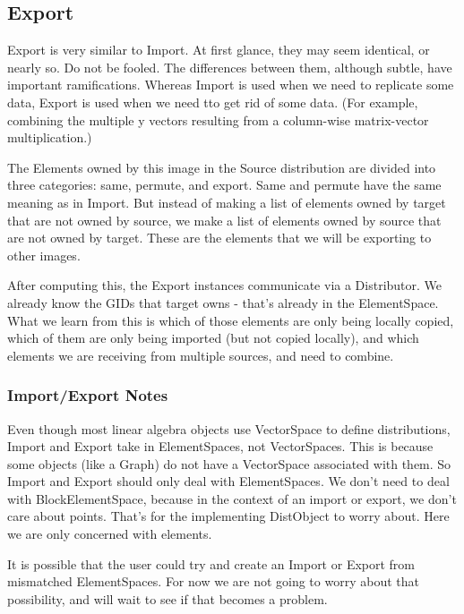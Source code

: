 \documentclass[10pt,relax]{TpetraDesign}
\begin{document}

%
\subsection{Export}

Export is very similar to Import. At first glance, they may seem identical, or nearly so. Do not be fooled. The differences between them, although subtle, have important ramifications. Whereas Import is used when we need to replicate some data, Export is used when we need tto get rid of some data. (For example, combining the multiple y vectors resulting from a column-wise matrix-vector multiplication.)

The Elements owned by this image in the Source distribution are divided into three categories: same, permute, and export. Same and permute have the same meaning as in Import. But instead of making a list of elements owned by target that are not owned by source, we make a list of elements owned by source that are not owned by target. These are the elements that we will be exporting to other images.

After computing this, the Export instances communicate via a Distributor. We already know the GIDs that target owns - that's already in the ElementSpace. What we learn from this is which of those elements are only being locally copied, which of them are only being imported (but not copied locally), and which elements we are receiving from multiple sources, and need to combine.


\subsubsection*{Import/Export Notes}
Even though most linear algebra objects use VectorSpace to define distributions, Import and Export take in ElementSpaces, not VectorSpaces. This is because some objects (like a Graph) do not have a VectorSpace associated with them. So Import and Export should only deal with ElementSpaces. We don't need to deal with BlockElementSpace, because in the context of an import or export, we don't care about points. That's for the implementing DistObject to worry about. Here we are only concerned with elements.

It is possible that the user could try and create an Import or Export from mismatched ElementSpaces. For now we are not going to worry about that possibility, and will wait to see if that becomes a problem.
\end{document}
